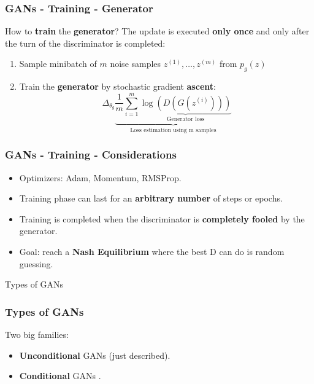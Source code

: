 \documentclass{beamer}
\begin{document}
\begin{frame}
\frametitle{GANs - Training - Generator}
How to \textbf{train} the \textbf{generator}? \newline
The update is executed \textbf{only once} and only after the turn of the discriminator is completed:
\begin{enumerate}
	\item Sample minibatch of $m$ noise samples ${z^{(1)},\dots,z^{(m)}}$ from $p_g(z)$
	\item Train the \textbf{generator} by stochastic gradient \textbf{ascent}:
		$$ \Delta_{\theta_g} \underbrace{\frac{1}{m} \sum_{i=1}^{m} \underbrace{\log(D(G(z^{(i)})))}_{\text{Generator loss}}}_{\text{Loss estimation using m samples}} $$
\end{enumerate}
\end{frame} 

\begin{frame}
\frametitle{GANs - Training - Considerations}
\begin{itemize}
	\item Optimizers: Adam, Momentum, RMSProp.
	\item Training phase can last for an \textbf{arbitrary number} of steps or epochs.
	\item Training is completed when the discriminator is \textbf{completely fooled} by the generator.
	\item Goal: reach a \textbf{Nash Equilibrium} where the best D can do is random guessing.
\end{itemize}
 \end{frame}

\begin{frame}[standout]
Types of GANs
\end{frame}

\begin{frame}
\frametitle{Types of GANs}
Two big families:
\begin{itemize}
	\item \textbf{Unconditional} GANs (just described).
	\item \textbf{Conditional} GANs \citep{mirzaConditionalGenerativeAdversarial2014}.
\end{itemize}
\end{frame}
\end{document}

